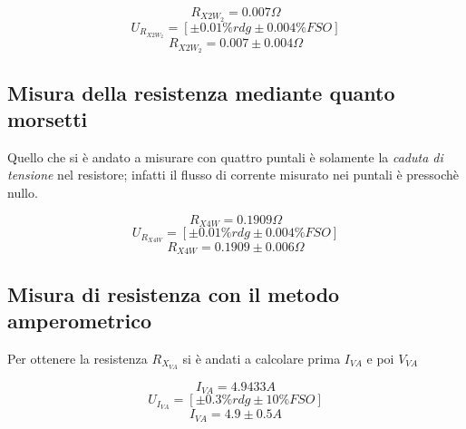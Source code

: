 \documentclass[a4paper]{article}
\begin{document}
\begin{Large}
	\begin{equation}
		R_{X2W_{2}} = 0.007 \Omega
	 \end{equation}
	\begin{equation}
		U_{R_{X2W_{2}}} = [\pm 0.01\%rdg \pm 0.004\% FSO]
	 \end{equation}
	 \begin{equation}
		R_{X2W_{2}} = 0.007 \pm 0.004 \Omega
	 \end{equation}
\end{Large}
\subsection{Misura della resistenza mediante quanto morsetti}
Quello che si è andato a misurare con quattro puntali è solamente la \emph{caduta di tensione} nel resistore; infatti il flusso di corrente misurato nei puntali è pressochè nullo.
\begin{Large}
	\begin{equation}
		R_{X4W}= 0.1909 \Omega
	\end{equation}
	\begin{equation}
		U_{R_{X4W}} = [\pm 0.01\%rdg \pm 0.004\% FSO]
	 \end{equation}
	 \begin{equation}
		R_{X4W} = 0.1909\pm 0.006 \Omega
	 \end{equation}
\end{Large}
\subsection{Misura di resistenza con il metodo amperometrico}
Per ottenere la resistenza $R_{X_{VA}}$ si è andati a calcolare prima $I_{VA}$ e poi $V_{VA}$
\begin{Large}
	\begin{equation}
		I_{VA}= 4.9433 A
	\end{equation}
	\begin{equation}
		U_{I_{VA}} = [\pm 0.3\%rdg \pm 10\% FSO]
	 \end{equation}
	 \begin{equation}
		I_{VA} = 4.9 \pm 0.5 A
	 \end{equation}
\end{Large}
\end{document}
